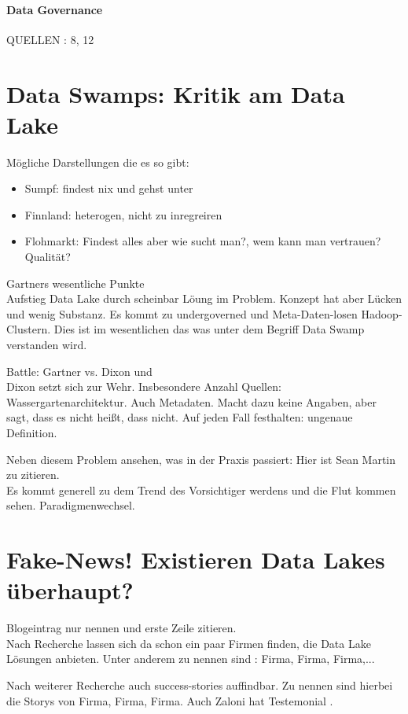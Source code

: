 \documentclass[twoside,twocolumn]{article}
\begin{document}
\paragraph{Data Governance}
QUELLEN : 8, 12


\section{Data Swamps: Kritik am Data Lake}
Mögliche Darstellungen die es so gibt:
\begin{itemize}
	\item Sumpf: findest nix und gehst unter \cite{src3}
	\item Finnland: heterogen, nicht zu inregreiren \cite{src13}
	\item Flohmarkt: Findest alles aber wie sucht man?, wem kann man vertrauen? Qualität? \cite{src12}
\end{itemize}

Gartners wesentliche Punkte\\
Aufstieg Data Lake durch scheinbar Löung im Problem. Konzept hat aber Lücken und wenig Substanz. Es kommt zu undergoverned und Meta-Daten-losen Hadoop-Clustern. Dies ist im wesentlichen das was unter dem Begriff Data Swamp verstanden wird.\cite{src3}

Battle: Gartner vs. Dixon und \\
Dixon setzt sich zur Wehr. Insbesondere Anzahl Quellen: Wassergartenarchitektur.\cite{src15} Auch Metadaten. Macht dazu keine Angaben, aber sagt, dass es nicht heißt, dass nicht.\cite{src14} Auf jeden Fall festhalten: ungenaue Definition.\

Neben diesem Problem ansehen, was in der Praxis passiert: Hier ist Sean Martin zu zitieren.\\
Es kommt generell zu dem Trend des Vorsichtiger werdens und die Flut kommen sehen. Paradigmenwechsel.\cite{src1}

\section{Fake-News! Existieren Data Lakes überhaupt?}
Blogeintrag nur nennen und erste Zeile zitieren.\cite{src4}\\

Nach Recherche lassen sich da schon ein paar Firmen finden, die Data Lake Lösungen anbieten.
Unter anderem zu nennen sind : Firma\cite{c1}, Firma\cite{c2}, Firma\cite{c3},...

Nach weiterer Recherche auch success-stories auffindbar. 
Zu nennen sind hierbei die Storys von Firma\cite{ss1}, Firma\cite{ss2}, Firma\cite{ss3}. Auch Zaloni hat Testemonial \cite{ss4}.
\end{document}
